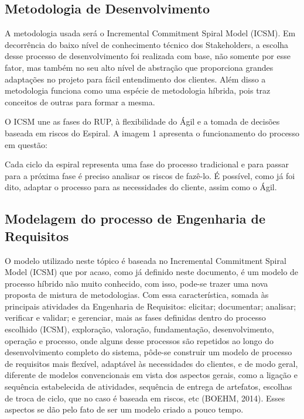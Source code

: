   \subsection{Metodologia de Desenvolvimento}
  
  A metodologia usada será o Incremental Commitment Spiral Model (ICSM). Em decorrência do baixo nível 
  de conhecimento técnico dos Stakeholders, a escolha desse processo de desenvolvimento foi realizada 
  com base, não somente por esse fator, mas também no seu alto nível de abstração que proporciona 
  grandes adaptações no projeto para fácil entendimento dos clientes. Além disso a metodologia funciona 
  como uma espécie de metodologia híbrida, pois traz conceitos de outras para formar a mesma.

  O ICSM une as fases do RUP, à flexibilidade do Ágil e a tomada de decisões baseada em riscos do 
  Espiral. A imagem 1 apresenta o funcionamento do processo em questão:


  Cada ciclo da espiral representa uma fase do processo tradicional e para passar para a próxima fase 
  é preciso analisar os riscos de fazê-lo. É possível, como já foi dito, adaptar o processo para as
  necessidades do cliente, assim como o Ágil.

  \subsection{Modelagem do processo de Engenharia de Requisitos}

  O modelo utilizado neste tópico é baseada no Incremental Commitment Spiral Model (ICSM) que por
  acaso, como já definido neste documento, é um modelo de processo híbrido não muito conhecido, 
  com isso, pode-se trazer uma nova proposta de mistura de metodologias. Com essa característica, 
  somada às principais atividades da Engenharia de Requisitos: elicitar; documentar; analisar; 
  verificar e validar; e gerenciar, mais as fases definidas dentro do processo escolhido (ICSM), 
  exploração, valoração, fundamentação, desenvolvimento, operação e processo, onde alguns desse 
  processos são repetidos ao longo do desenvolvimento completo do sistema, pôde-se construir um 
  modelo de processo de requisitos mais flexível, adaptável às necessidades do clientes, e de modo 
  geral, diferente de modelos convencionais em vista dos aspectos gerais, como a ligação e 
  sequência estabelecida de atividades, sequência de entrega de artefatos, escolhas de troca de ciclo, 
  que no caso é baseada em riscos, etc (BOEHM, 2014). Esses aspectos se dão pelo fato de ser um 
  modelo criado a pouco tempo. 
  
